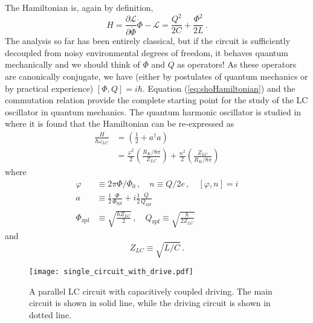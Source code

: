 The Hamiltonian is, again by definition,
\begin{equation}
  H
  = \frac{\partial \mathcal{L}}{\partial \dot{\Phi}} \dot{\Phi} - \mathcal{L}
  = \frac{Q^2}{2C} + \frac{\Phi^2}{2L} \, . \label{eq:shoHamiltonian}
\end{equation}
The analysis so far has been entirely classical, but if the circuit is sufficiently decoupled from noisy environmental degrees of freedom, it behaves quantum mechanically and we should think of $\Phi$ and $Q$ as operators!
As these operators are canonically conjugate, we have (either by postulates of quantum mechanics or by practical experience) $[\Phi,Q]=i\hbar$.
Equation (\ref{eq:shoHamiltonian}) and the commutation relation provide the complete starting point for the study of the LC oscillator in quantum mechanics.
The quantum harmonic oscillator is studied in \citeinternaltype {} where it is found that the Hamiltonian can be re-expressed as
\begin{align}
  \frac{H}{\hbar \omega_{LC}}
  &= \left( \frac{1}{2} + a^\dagger a \right) \nonumber \\
  &= \frac{\varphi^2}{2} \left( \frac{R_K / 8 \pi}{Z_{LC}} \right)
   + \frac{n^2}{2} \left( \frac{Z_{LC}}{R_K / 8 \pi} \right)
\end{align}
where
\begin{align}
  \varphi &\equiv 2 \pi \Phi / \Phi_0 \, , \quad n \equiv Q / 2e \, , \quad [\varphi, n] = i \\
  a &\equiv
      \frac{1}{2} \frac{\Phi}{\Phi_\text{zpf}}
  + i \frac{1}{2} \frac{Q}{Q_\text{zpf}} \\
  \Phi_\text{zpf} &\equiv \sqrt{\frac{\hbar Z_{LC}}{2}} \, , \quad
  Q_\text{zpf} \equiv \sqrt{\frac{\hbar}{2 Z_{LC}}}
\end{align}
and
\begin{equation}
  Z_{LC} \equiv \sqrt{L/C} \, .
\end{equation}

\begin{figure}
\begin{centering}
\texttt{[image: single\_circuit\_with\_drive.pdf]} 
\par\end{centering}
  \caption{A parallel LC circuit with capacitively coupled driving. The main circuit is shown in solid line, while the driving circuit is shown in dotted line.}
\label{Fig:singleCircuit}
\end{figure}

